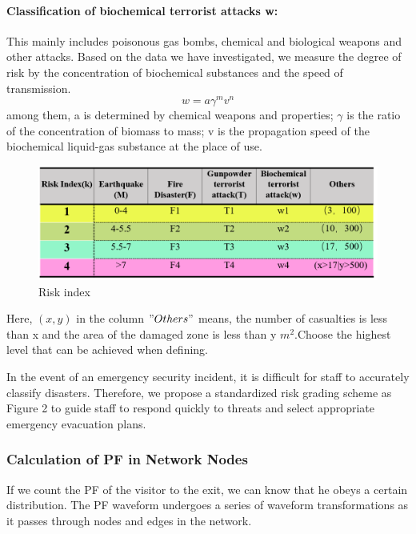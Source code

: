 \paragraph{Classification of biochemical terrorist attacks w:} This mainly includes poisonous gas bombs, chemical and biological weapons and other attacks. Based on the data we have investigated, we measure the degree of risk by the concentration of biochemical substances and the speed of transmission.
\[
  w=a\gamma^mv^n  
\]
 among them, a is determined by chemical weapons and properties; $\gamma$ is the ratio of the concentration of biomass to mass; v is the propagation speed of the biochemical liquid-gas substance at the place of use.
 \begin{figure}[H]
    \centering
    \includegraphics[scale=0.4]{riskindex.png}
    \caption{Risk index}
    \label{1}
\end{figure}
 Here, $(x,y)$ in the column $"Others"$ means, the number of casualties is less than x and the area of the damaged zone is less than y $m^2$.Choose the highest level that can be achieved when defining.

In the event of an emergency security incident, it is difficult for staff to accurately classify disasters. Therefore, we propose a standardized risk grading scheme as Figure 2 to guide staff to respond quickly to threats and select appropriate emergency evacuation plans.

\subsubsection{Calculation of PF in Network Nodes}

If we count the PF of the visitor to the exit, we can know that he obeys a certain distribution. The PF waveform undergoes a series of waveform transformations as it passes through nodes and edges in the network.




